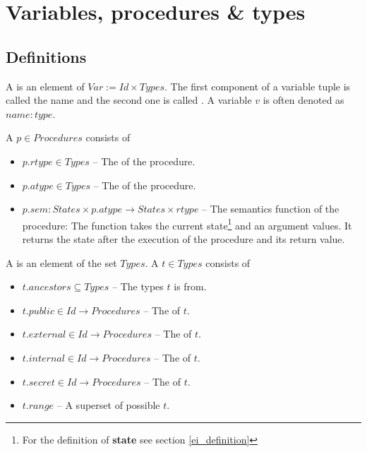 \chapter{Variables, procedures \& types}

\section {Definitions}

\bigskip

A  is an element of $Var := Id \times Types$. The first component of a variable tuple is called the  name and the second one is called .
A variable $v$ is often denoted as $name : type$.
 
\bigskip

A  $p \in Procedures$ consists of
\begin{itemize}
\item $p.rtype \in Types$ -- The  of the procedure.
\item $p.atype \in Types$ -- The  of the procedure.
\item $p.sem: States \times p.atype \rightarrow States \times rtype$ -- The semantics function of the procedure: The function takes the current state\footnote{For the definition of \textbf{state} see section \ref{ei_definition}} and an argument values. It returns the state after the execution of the procedure and its return value.
\end{itemize}

\medskip



A  is an element of the set $Types$. A $t \in Types$ consists of
\begin{itemize}
\item $t.ancestors \subseteq Types$ -- The types $t$ is  from.
\item $t.public \in Id \rightarrow Procedures$ -- The  of $t$.
\item $t.external \in Id \rightarrow Procedures$ -- The  of $t$.
\item $t.internal \in Id \rightarrow Procedures$ -- The  of $t$.
\item $t.secret \in Id \rightarrow Procedures$ -- The  of $t$.
\item $t.range$ -- A superset of possible  $t$.
\end{itemize}

